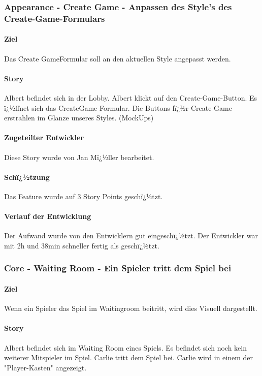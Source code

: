\documentclass[12pt, titlepage]{scrartcl}
\begin{document}
			\subsubsection{Appearance - Create Game - Anpassen des Style's des Create-Game-Formulars}
			\paragraph{Ziel} Das \glqq Create Game\grqq Formular soll an den aktuellen Style angepasst werden.
			\paragraph{Story} Albert befindet sich in der Lobby. Albert klickt auf den Create-Game-Button. Es ï¿½ffnet sich das CreateGame Formular. Die Buttons fï¿½r Create Game erstrahlen im Glanze unseres Styles. (MockUps)
			\paragraph{Zugeteilter Entwickler} Diese Story wurde von Jan Mï¿½ller bearbeitet.
			\paragraph{Schï¿½tzung}
			Das Feature wurde auf 3 Story Points geschï¿½tzt.
			\paragraph{Verlauf der Entwicklung} 
			Der Aufwand wurde von den Entwicklern gut eingeschï¿½tzt. Der Entwickler war mit 2h und 38min schneller fertig als geschï¿½tzt. 
			
			\subsubsection{Core - Waiting Room - Ein Spieler tritt dem Spiel bei}
			\paragraph{Ziel} Wenn ein Spieler das Spiel im Waitingroom beitritt, wird dies Visuell dargestellt.
			\paragraph{Story} Albert befindet sich im Waiting Room eines Spiels. Es befindet sich noch kein weiterer Mitspieler im Spiel. Carlie tritt dem Spiel bei. Carlie wird in einem der "Player-Kasten" angezeigt.
\end{document}
